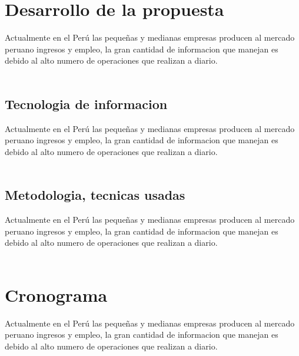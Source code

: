 \documentclass[twoside,twocolumn]{article}
\begin{document}
\section{Desarrollo de la propuesta}
Actualmente en el Perú las pequeñas y medianas empresas producen al mercado peruano ingresos y empleo, la gran cantidad de informacion que manejan es debido al alto numero de operaciones que realizan a diario.\\ \\

\subsection{Tecnologia de informacion}
Actualmente en el Perú las pequeñas y medianas empresas producen al mercado peruano ingresos y empleo, la gran cantidad de informacion que manejan es debido al alto numero de operaciones que realizan a diario.\\ \\

\subsection{Metodologia, tecnicas usadas}
Actualmente en el Perú las pequeñas y medianas empresas producen al mercado peruano ingresos y empleo, la gran cantidad de informacion que manejan es debido al alto numero de operaciones que realizan a diario.\\ \\

\section{Cronograma}
Actualmente en el Perú las pequeñas y medianas empresas producen al mercado peruano ingresos y empleo, la gran cantidad de informacion que manejan es debido al alto numero de operaciones que realizan a diario.\\ \\


\end{document}
